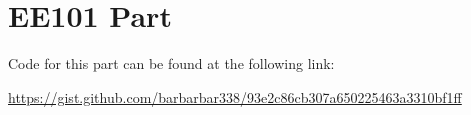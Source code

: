 \chapter{EE101 Part}

Code for this part can be found at the following link:

\bigbreak

\noindent\url{https://gist.github.com/barbarbar338/93e2c86cb307a650225463a3310bf1ff}
